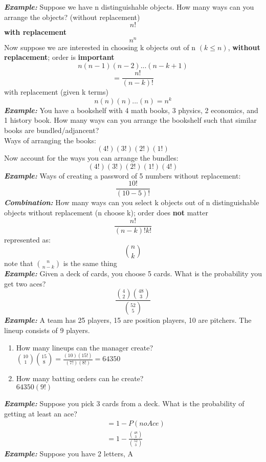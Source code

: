 \documentclass[12pt]{article}
\begin{document}
    \textit{\textbf{Example:}} Suppose we have n distinguishable objects. 
    How many ways can you arrange the objects? (without replacement) 
    $$n!$$
    \textbf{with replacement}
    $$n^n$$
    Now suppose we are interested in choosing k objects out of n $(k \leq n)$, 
    \textbf{without replacement}; order is \textbf{important}
    $$n(n-1)(n-2)...(n-k+1)$$
    $$=\frac{n!}{(n-k)!}$$
    with replacement (given k terms)
    $$n(n)(n)...(n) = n^k$$
    \textit{\textbf{Example:}} You have a bookshelf with 4 math books, 
    3 physics, 2 economics, and 1 history book. How many ways can you arrange 
    the bookshelf such that similar books are bundled/adjancent?\\[\baselineskip]
    Ways of arranging the books:
    $$(4!)(3!)(2!)(1!)$$
    Now account for the ways you can arrange the bundles:
    $$(4!)(3!)(2!)(1!)(4!)$$
    \textit{\textbf{Example:}} Ways of creating a password of 
    5 numbers without replacement:
    $$\frac{10!}{(10-5)!}$$
    \textit{\textbf{Combination:}} How many ways can you select k 
    objects out of n distinguishable objects without replacement 
    (n choose k); order does \textbf{not} matter
    $$\frac{n!}{(n-k)!k!}$$
    represented as:
    $$\binom{n}{k}$$
    note that $\binom{n}{n-k}$ is the same thing\\[\baselineskip]
    \textit{\textbf{Example:}} Given a deck of cards, you choose 
    5 cards. What is the probability you get two aces?
    $$\frac{\binom{4}{2}\binom{48}{3}}{\binom{52}{5}}$$
    \textit{\textbf{Example:}} A team has 25 players, 15 are position 
    players, 10 are pitchers. The lineup consists of 9 players.
    \begin{enumerate}[label=(\alph*)]
        \item How many lineups can the manager create?\\
        $\binom{10}{1}\binom{15}{8} = \frac{(10)(15!)}{(7!)(8!)} = 64350$
        \item How many batting orders can he create?\\
        $64350(9!)$
    \end{enumerate}
    \textit{\textbf{Example:}} Suppose you pick 3 cards
    from a deck. What is the probability of getting at
    least an ace?
    \begin{align*}
        &= 1 - P(noAce)\\
        &= 1 - \frac{\binom{48}{3}}{\binom{52}{3}}
    \end{align*}
    \textit{\textbf{Example:}} Suppose you have 2 letters, A
\end{document}
